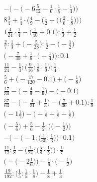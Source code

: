 \documentclass[8pt]{article}
\begin{document}
\begin{align}
-\Big(-\big(-6\frac{5}{12} - \frac{1}{6} \cdot \frac{1}{5} - \frac{1}{4}\big)\Big) \\
8\frac{3}{4} + \frac{1}{4} \cdot \bigg(\frac{4}{9} - \Big(\frac{1}{2} - \big(1\frac{2}{6} \cdot \frac{1}{8}\big)\Big)\bigg) \\
1\frac{4}{24} \cdot \frac{1}{4} - \big(\frac{1}{40} + 0.1\big) : \frac{1}{3} + \frac{1}{2} \\
\frac{2}{7} : \frac{1}{3} + \big(-\frac{5}{28}\big) : \frac{1}{2} - \big(-\frac{1}{2}\big) \\
\Big(-\frac{7}{30} + \frac{1}{6} \cdot \big(-\frac{1}{4}\big)\Big) : 0.1 \\
\frac{11}{24} - \frac{1}{3} : \big(\frac{9}{16} : \frac{1}{8} \cdot \frac{1}{9}\big) : \frac{1}{4} \\
\frac{5}{6} + \big(-\frac{17}{120} - 0.1\big) + \big(-\frac{1}{8}\big) \\
\frac{17}{30} - \big(-\frac{4}{9} - \frac{1}{9}\big) - \big(-0.1\big) \\
\frac{37}{63} - \big(-\frac{4}{21} + \frac{1}{3}\big) - \big(\frac{7}{30} + 0.1\big) : \frac{1}{9} \\
\big(-1\frac{1}{7}\big) - \big(-\frac{1}{7} + \frac{1}{7} - \frac{1}{7}\big) \\
\Big(-\frac{5}{6}\Big) + \frac{5}{6} - \frac{1}{2} : \Big(\big(-\frac{1}{2}\big)\Big) \\
-\bigg(-\Big(-1 : \big(\frac{1}{30} : \frac{1}{3}\big)\Big) \cdot 0.1\bigg) \\
\frac{11}{12} : \frac{1}{8} - \Big(\frac{1}{24} : \big(\frac{5}{8} \cdot \frac{1}{5}\big)\Big) \cdot \frac{1}{7} \\
\Big(-\big(-2\frac{1}{6}\big)\Big) - \frac{1}{6} \cdot \Big(-\frac{1}{2}\Big) \\
\frac{19}{192} : \big(\frac{1}{5} : \frac{1}{5} \cdot \frac{1}{8}\big) - \frac{1}{8} + \frac{1}{3}
\end{align}
\end{document}
